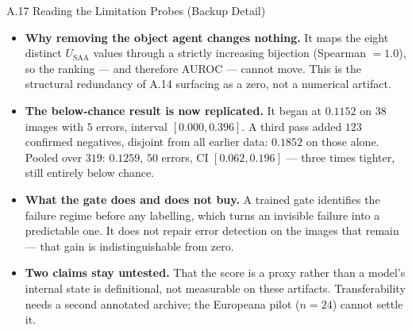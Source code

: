 \documentclass[aspectratio=169,11pt]{beamer}
\begin{document}
\begin{frame}{A.17 Reading the Limitation Probes (Backup Detail)}
\footnotesize
\begin{itemize}
  \setlength\itemsep{3pt}
  \item \textbf{Why removing the object agent changes nothing.} It maps the eight distinct $U_{\text{SAA}}$ values through a strictly increasing bijection (Spearman $=1.0$), so the ranking --- and therefore AUROC --- cannot move. This is the structural redundancy of A.14 surfacing as a zero, not a numerical artifact.
  \item \textbf{The below-chance result is now replicated.} It began at $0.1152$ on $38$ images with $5$ errors, interval $[0.000,0.396]$. A third pass added $123$ confirmed negatives, disjoint from all earlier data: $0.1852$ on those alone. Pooled over $319$: $\mathbf{0.1259}$, $50$ errors, CI $[0.062,0.196]$ --- three times tighter, still entirely below chance.
  \item \textbf{What the gate does and does not buy.} A trained gate identifies the failure regime before any labelling, which turns an invisible failure into a predictable one. It does not repair error detection on the images that remain --- that gain is indistinguishable from zero.
  \item \textbf{Two claims stay untested.} That the score is a proxy rather than a model's internal state is definitional, not measurable on these artifacts. Transferability needs a second annotated archive; the Europeana pilot ($n=24$) cannot settle it.
\end{itemize}
\end{frame}
\end{document}
